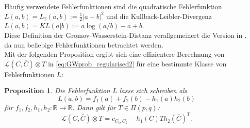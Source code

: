 \documentclass[11pt,a4paper]{article}
\newtheorem{proposition}[theorem]{Proposition}
\numberwithin{equation}{section}
\begin{document}

	
	
	\noindent Häufig verwendete Fehlerfunktionen sind die quadratische Fehlerfunktion $L(a,b) = L_2(a,b) := \frac{1}{2}|a-b|^2$ und die Kullback-Leibler-Divergenz $L(a,b)  = KL(a|b) := a\log(a/b) -a+b$.\\
	
	Diese Definition der Gromov-Wasserstein-Distanz verallgemeinert die Version in \cite{gwd_averaging_kernels}, da nun beliebige Fehlerfunktionen betrachtet werden.\\
	
	
	
	Mit der folgenden Proposition ergibt sich eine effizientere Berechnung von $\mathcal{L} (C, \bar{C}) \otimes T$ in \autoref{eq:GWprob_regularised2} für eine bestimmte Klasse von Fehlerfunktionen $L$:
	
	\begin{proposition}\label{prop:loss_reformulated}
		Die Fehlerfunktion $L$ lasse sich schreiben als 
		\begin{equation}
		L(a,b) = f_1(a) + f_2(b) - h_1(a)h_2(b) \label{eq:L_darstellung}
		\end{equation}
		für $f_1, f_2,h_1, h_2:\mathbb{R} \to \mathbb{R}$. Dann gilt für $T \in \Pi (p,q)$:
		\begin{equation}
		\mathcal{L} (C, \bar{C}) \otimes T = c_{C_1, C_2} - h_1(C)Th_2(\bar{C})^T. \label{eq:berechnung_tensorprodukt}
		\end{equation}
	\end{proposition} 

	
	

\end{document}
